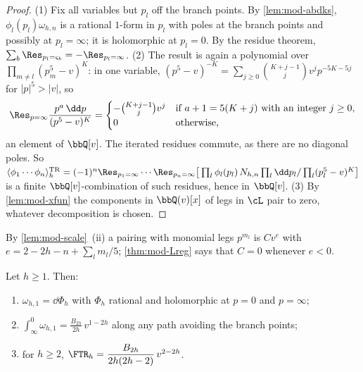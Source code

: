 \begin{proof}
(1) Fix all variables but $p_l$ off the branch points. By \cref{lem:mod-abdks}, $\phi_l(p_l)\omega_{h,n}$ is a rational $1$-form in $p_l$ with poles at the branch points and possibly at $p_l=\infty$; it is holomorphic at $p_l=0$. By the residue theorem, $\sum_b\Res_{p_l=\varsigma_b}=-\Res_{p_l=\infty}$. (2) The result is again a polynomial over $\prod_{m\neq l}(p_m^5-v)^K$: in one variable, $(p^5-v)^{-K}=\sum_{j\geq 0}\binom{K+j-1}{j}v^jp^{-5K-5j}$ for $|p|^5>|v|$, so
\[
\Res_{p=\infty}\frac{p^a\,\dd p}{(p^5-v)^K}=\begin{cases}-\binom{K+j-1}{j}v^j&\text{if }a+1=5(K+j)\text{ with an integer }j\geq 0,\\ 0&\text{otherwise,}\end{cases}
\]
an element of $\bbQ[v]$. The iterated residues commute, as there are no diagonal poles. So $\langle\phi_1\cdots\phi_n\rangle^{\mathrm{TR}}_h=(-1)^n\Res_{p_1=\infty}\cdots\Res_{p_n=\infty}\big[\prod_l\phi_l(p_l)\,N_{h,n}\prod_l\dd p_l/\prod_l(p_l^5-v)^K\big]$ is a finite $\bbQ[v]$-combination of such residues, hence in $\bbQ[v]$. (3) By \cref{lem:mod-xfun} the components in $\bbQ(v)[x]$ of legs in $\cL$ pair to zero, whatever decomposition is chosen.
\end{proof}

By \cref{lem:mod-scale}~(ii) a pairing with monomial legs $p^{m_l}$ is $Cv^e$ with $e=2-2h-n+\sum_lm_l/5$; \cref{thm:mod-Lreg} says that $C=0$ whenever $e<0$.

\begin{prop}
\label{prop:mod-period}
Let $h\geq 1$. Then:
\begin{enumerate}
\item $\omega_{h,1}=\dd\Phi_h$ with $\Phi_h$ rational and holomorphic at $p=0$ and $p=\infty$;
\item $\int_\infty^0\omega_{h,1}=\frac{B_{2h}}{2h}\,v^{1-2h}$ along any path avoiding the branch points;
\item for $h\geq 2$, $\FTR_h=\dfrac{B_{2h}}{2h(2h-2)}\,v^{2-2h}$.
\end{enumerate}
\end{prop}

